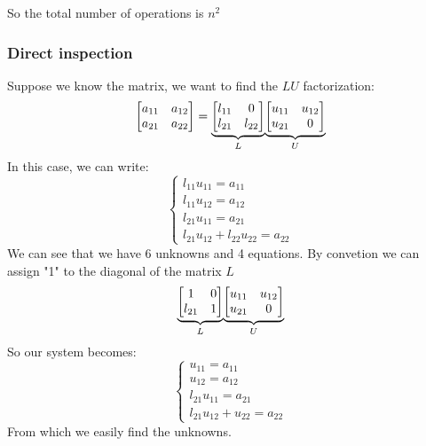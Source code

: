 So the total number of operations is $n^2$

\subsubsection{Direct inspection}
Suppose we know the matrix, we want to find the $LU$ factorization:
$$
\begin{bmatrix}
    a_{11} & a_{12}\\
    a_{21} & a_{22}\\
\end{bmatrix}=
\underlabel{
    \begin{bmatrix}
        l_{11} & 0\\
        l_{21} & l_{22}\\
    \end{bmatrix}
}{$L$}
\underlabel{
    \begin{bmatrix}
        u_{11} & u_{12}\\
        u_{21} & 0\\
    \end{bmatrix}
}{$U$}
$$
In this case, we can write:
$$
\begin{cases}
    l_{11}u_{11}=a_{11}\\
    l_{11}u_{12}=a_{12}\\
    l_{21}u_{11}=a_{21}\\
    l_{21}u_{12}+l_{22}u_{22}=a_{22}        
\end{cases}
$$
We can see that we have 6 unknowns and 4 equations. By convetion we can assign "1" to the diagonal of the matrix $L$
$$
\underlabel{
    \begin{bmatrix}
        1 & 0\\
        l_{21} & 1\\
    \end{bmatrix}
}{$L$}
\underlabel{
    \begin{bmatrix}
        u_{11} & u_{12}\\
        u_{21} & 0\\
    \end{bmatrix}
}{$U$}
$$
So our system becomes:
$$
\begin{cases}
    u_{11}=a_{11}\\
    u_{12}=a_{12}\\
    l_{21}u_{11}=a_{21}\\
    l_{21}u_{12}+u_{22}=a_{22}        
\end{cases}
$$
From which we easily find the unknowns.

